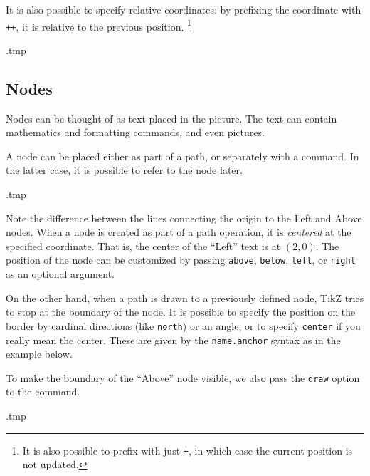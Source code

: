 It is also possible to specify relative coordinates:
by prefixing the coordinate with \verb|++|, it is relative to the previous position.%
\footnote{It is also possible to prefix with just \texttt{+},
in which case the current position is not updated.}
%
\begin{VerbatimOut}{\jobname.tmp}
\end{VerbatimOut}
\ShowExample


%
%
\subsection{Nodes}

Nodes can be thought of as text placed in the picture.
The text can contain mathematics and formatting commands, and even pictures.

A node can be placed either as part of a path, or separately with a  command.
In the latter case, it is possible to refer to the node later.
%
\begin{VerbatimOut}{\jobname.tmp}
\end{VerbatimOut}
\ShowExample

Note the difference between the lines connecting the origin to the Left and Above nodes.
When a node is created as part of a path operation,
it is \emph{centered} at the specified coordinate.
That is, the center of the ``Left'' text is at $(2,0)$.
The position of the node can be customized by passing
\verb|above|, \verb|below|, \verb|left|, or \verb|right| as an optional argument.

On the other hand, when a path is drawn to a previously defined node,
TikZ tries to stop at the boundary of the node.
It is possible to specify the position on the border by cardinal directions (like \verb|north|)
or an angle; or to specify \verb|center| if you really mean the center.
These are given by the \verb|name.anchor| syntax as in the example below.

To make the boundary of the ``Above'' node visible,
we also pass the \verb|draw| option to the  command.
%
\begin{VerbatimOut}{\jobname.tmp}
\end{VerbatimOut}
\ShowExample

